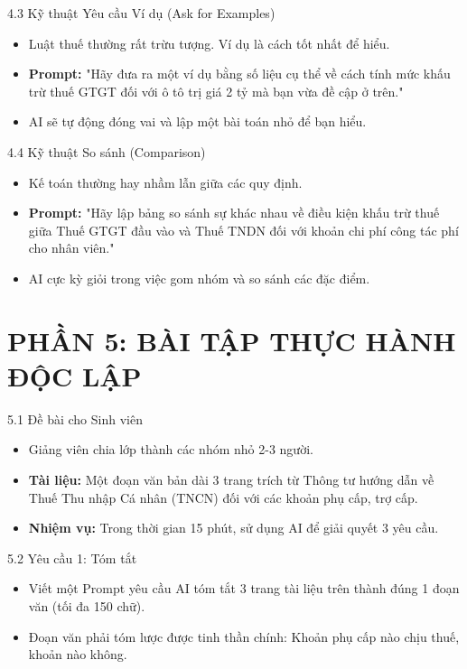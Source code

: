 \documentclass[aspectratio=169]{beamer}
\begin{document}
\begin{frame}{4.3 Kỹ thuật Yêu cầu Ví dụ (Ask for Examples)}
    \begin{itemize}
        \item Luật thuế thường rất trừu tượng. Ví dụ là cách tốt nhất để hiểu.
        \item \textbf{Prompt:} "Hãy đưa ra một ví dụ bằng số liệu cụ thể về cách tính mức khấu trừ thuế GTGT đối với ô tô trị giá 2 tỷ mà bạn vừa đề cập ở trên."
        \item AI sẽ tự động đóng vai và lập một bài toán nhỏ để bạn hiểu.
    \end{itemize}
\end{frame}


\begin{frame}{4.4 Kỹ thuật So sánh (Comparison)}
    \begin{itemize}
        \item Kế toán thường hay nhầm lẫn giữa các quy định.
        \item \textbf{Prompt:} "Hãy lập bảng so sánh sự khác nhau về điều kiện khấu trừ thuế giữa Thuế GTGT đầu vào và Thuế TNDN đối với khoản chi phí công tác phí cho nhân viên."
        \item AI cực kỳ giỏi trong việc gom nhóm và so sánh các đặc điểm.
    \end{itemize}
\end{frame}


\section{PHẦN 5: BÀI TẬP THỰC HÀNH ĐỘC LẬP}


\begin{frame}{5.1 Đề bài cho Sinh viên}
    \begin{itemize}
        \item Giảng viên chia lớp thành các nhóm nhỏ 2-3 người.
        \item \textbf{Tài liệu:} Một đoạn văn bản dài 3 trang trích từ Thông tư hướng dẫn về Thuế Thu nhập Cá nhân (TNCN) đối với các khoản phụ cấp, trợ cấp.
        \item \textbf{Nhiệm vụ:} Trong thời gian 15 phút, sử dụng AI để giải quyết 3 yêu cầu.
    \end{itemize}
\end{frame}


\begin{frame}{5.2 Yêu cầu 1: Tóm tắt}
    \begin{itemize}
        \item Viết một Prompt yêu cầu AI tóm tắt 3 trang tài liệu trên thành đúng 1 đoạn văn (tối đa 150 chữ).
        \item Đoạn văn phải tóm lược được tinh thần chính: Khoản phụ cấp nào chịu thuế, khoản nào không.
    \end{itemize}
\end{frame}
\end{document}
